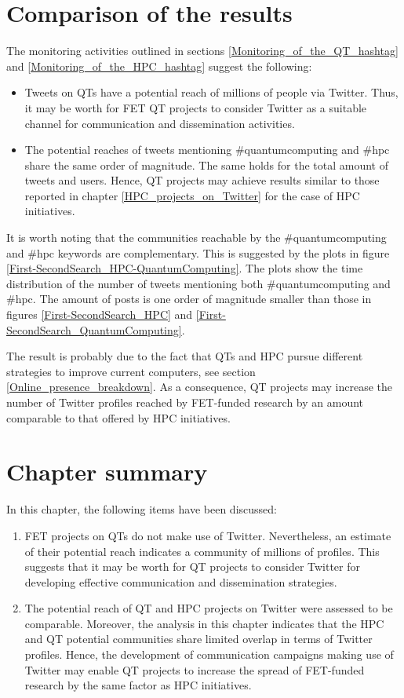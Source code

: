 \section{Comparison of the results} \label{Comparison_of_the_results}
The monitoring activities outlined in sections \ref{Monitoring_of_the_QT_hashtag} and \ref{Monitoring_of_the_HPC_hashtag} suggest the following:

\begin{itemize}
 \item Tweets on QTs have a potential reach of millions of people via Twitter. Thus, it may be worth for FET QT projects to consider Twitter as a suitable channel for communication and dissemination activities.
 \item The potential reaches of tweets mentioning \#quantumcomputing and \#hpc share the same order of magnitude. The same holds for the total amount of tweets and users. Hence, QT projects may achieve results similar to those reported in chapter \ref{HPC_projects_on_Twitter} for the case of HPC initiatives. 
\end{itemize}

It is worth noting that the communities reachable by the \#quantumcomputing and \#hpc keywords are complementary. This is suggested by the plots in figure \ref{First-SecondSearch_HPC-QuantumComputing}. The plots show the time distribution of the number of tweets mentioning both \#quantumcomputing and \#hpc. The amount of posts is one order of magnitude smaller than those in figures \ref{First-SecondSearch_HPC} and \ref{First-SecondSearch_QuantumComputing}. 

The result is probably due to the fact that QTs and HPC pursue different strategies to improve current computers, see section \ref{Online_presence_breakdown}. As a consequence, QT projects may increase the number of Twitter profiles reached by FET-funded research by an amount comparable to that offered by HPC initiatives. 

\section{Chapter summary} 
In this chapter, the following items have been discussed: 

\begin{enumerate}
 \item FET projects on QTs do not make use of Twitter. Nevertheless, an estimate of their potential reach indicates a community of millions of profiles. This suggests that it may be worth for QT projects to consider Twitter for developing effective communication and dissemination strategies.
 \item The potential reach of QT and HPC projects on Twitter were assessed to be comparable. Moreover, the analysis in this chapter indicates that the HPC and QT potential communities share limited overlap in terms of Twitter profiles. Hence, the development of communication campaigns making use of Twitter may enable QT projects to increase the spread of FET-funded research by the same factor as HPC initiatives.         
\end{enumerate}
